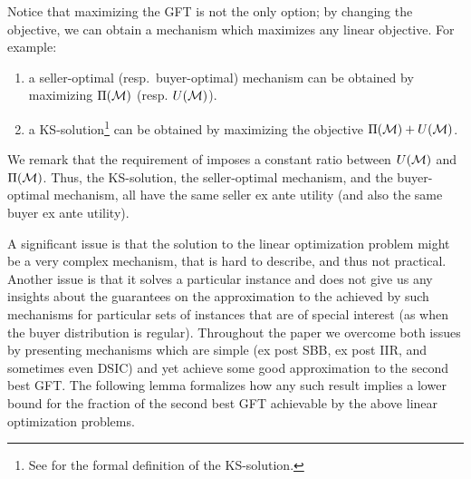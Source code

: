 Notice that maximizing the GFT is not the only option; by changing the objective, we can obtain a  {\ksfair} mechanism which maximizes any linear objective. For example:
\begin{enumerate}
    \item a seller-optimal (resp.\ buyer-optimal) {\ksfair} mechanism can be obtained by maximizing $\Pi(\mathcal{M})$ (resp. $U(\mathcal{M})$).
     \item a KS-solution\footnote{\label{footnote:ref-to-ks-solution}See  for the formal definition of the KS-solution.} can be obtained by maximizing the objective $\Pi(\mathcal{M})+U(\mathcal{M})$.%
\end{enumerate}
We remark that the requirement of {\ksfairness} imposes a constant ratio between $U(\mathcal{M})$ and $\Pi(\mathcal{M})$. Thus, the KS-solution, the seller-optimal {\ksfair} mechanism, and the buyer-optimal {\ksfair} mechanism, all have the same seller ex ante utility (and also the same buyer ex ante utility).



A significant issue is that the solution to the linear optimization problem might be a very complex mechanism, that is hard to describe, and  thus not practical. Another issue is that it solves a particular instance and does not give us any insights about the guarantees on the approximation to the {\SecondBest} achieved by such mechanisms for particular sets of instances that are of special interest (as when the buyer distribution is regular). Throughout the paper we overcome both issues by presenting {\ksfair} mechanisms which are simple (ex post SBB, ex post IIR, and sometimes even DSIC) and yet achieve some good approximation to the second best GFT. The following lemma formalizes how any such result implies a lower bound for the fraction of the second best GFT achievable by the above linear optimization problems. 

